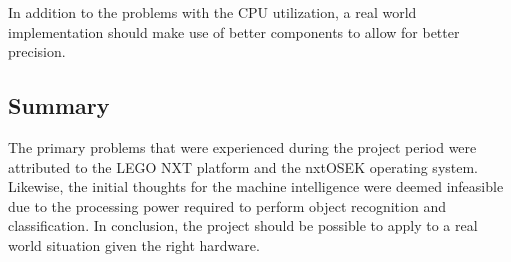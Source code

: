 In addition to the problems with the CPU utilization, a real world implementation should make use of better components to allow for better precision.

\subsection{Summary}
The primary problems that were experienced during the project period were attributed to the LEGO NXT platform and the nxtOSEK operating system.
Likewise, the initial thoughts for the machine intelligence were deemed infeasible due to the processing power required to perform object recognition and classification. 
In conclusion, the project should be possible to apply to a real world situation given the right hardware.
